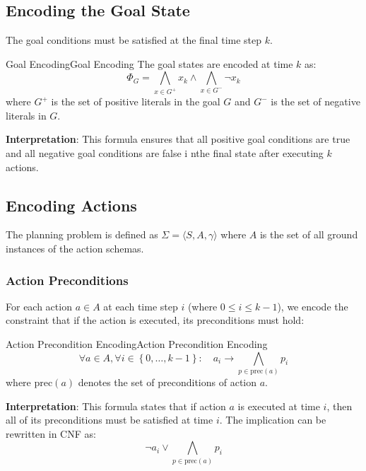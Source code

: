\documentclass[a4paper]{article}
\theoremstyle{definition}
\begin{document}
\subsection{Encoding the Goal State}
The goal conditions must be satisfied at the final time step \( k \).
\begin{definition}{Goal Encoding}{Goal Encoding}
The goal states are encoded at time \( k \) as:
\[
  \Phi_G = \bigwedge_{x \in G^+} x_k \wedge \bigwedge_{x \in G^-} \lnot x_k
\]
where \( G^+ \) is the set of positive literals in the goal \( G \) and \( G^- \) is the set of negative literals in \( G \).
\end{definition}
\textbf{Interpretation}: This formula ensures that all positive goal conditions are true and all negative goal conditions are false 
i nthe final state after executing \( k \) actions.
\subsection{Encoding Actions}
The planning problem is defined as \( \Sigma = \langle S, A, \gamma \rangle \) where \( A \) is the set of all ground instances of 
the action schemas.
\subsubsection{Action Preconditions}
For each action \( a \in A \) at each time step \( i \) (where $0 \leq i \leq k - 1$), we encode the constraint that 
if the action is executed, its preconditions must hold:
\begin{definition}{Action Precondition Encoding}{Action Precondition Encoding}
\[
  \forall a \in A, \forall i \in \left\{0, \ldots, k - 1 \right\}: \quad a_i \rightarrow \bigwedge_{p \in \text{prec}(a)}p_i
\]
where \( \text{prec}(a) \) denotes the set of preconditions of action \( a \).
\end{definition}
\textbf{Interpretation}: This formula states that if action \( a \) is executed at time \( i \), then all of its preconditions 
must be satisfied at time \( i \). The implication can be rewritten in CNF as:
\[
  \lnot a_i \vee \bigwedge_{p \in \text{prec}(a)} p_i
\]
\end{document}
